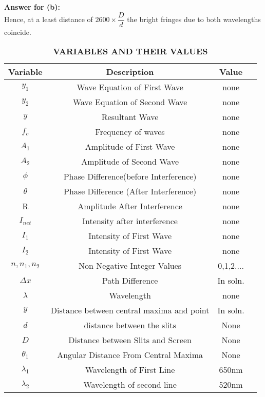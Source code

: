 \documentclass[journal,12pt,twocolumn]{IEEEtran}
\theoremstyle{remark}
\begin{document}
\textbf{Answer for (b):}
\\
Hence, at a least distance of $2600\times\dfrac{D}{d}$ the bright fringes due to  both wavelengths coincide.

\begin{table}
    \centering
    \begin{tabular}{|c|c|c|c|}
    \hline
       \textbf{Variable}& \textbf{Description}& \textbf{Value}\\\hline
         $y_1$& Wave Equation of First Wave&none\\\hline
          $y_2$&Wave Equation of Second Wave &none\\\hline
         $y$&   Resultant Wave&none\\\hline
          $f_c$& Frequency of waves&none\\\hline
         $A_1$& Amplitude of First Wave&none\\\hline
         $A_2$& Amplitude of Second Wave&none\\\hline
         $\phi$& Phase Difference(before Interference)&none\\\hline
         $\theta$& Phase Difference (After Interference)&none\\\hline
         R& Amplitude After Interference&none\\\hline
         $I_{net}$& Intensity after interference&none\\\hline
         $I_1$& Intensity of First Wave&none\\\hline
         $I_2$& Intensity of First Wave&none\\\hline
         $n,n_1,n_2$& Non Negative Integer Values&0,1,2....\\\hline
         $\Delta x$& Path Difference&In soln.\\\hline
         $\lambda$& Wavelength&none\\\hline
         $y$& Distance between central maxima and point&In soln.\\\hline
         $d$& distance between the slits&None\\\hline
         $D$& Distance between Slits and Screen&None\\\hline
         $\theta_1$& Angular Distance From Central Maxima&None\\\hline
        $\lambda_1$& Wavelength of First Line&650nm\\\hline
        $\lambda_2$& Wavelength of second line&520nm\\\hline
    \end{tabular}
    \caption{\textbf{VARIABLES AND THEIR VALUES}}
    \label{tab:my_label}
\end{table}
\end{document}
